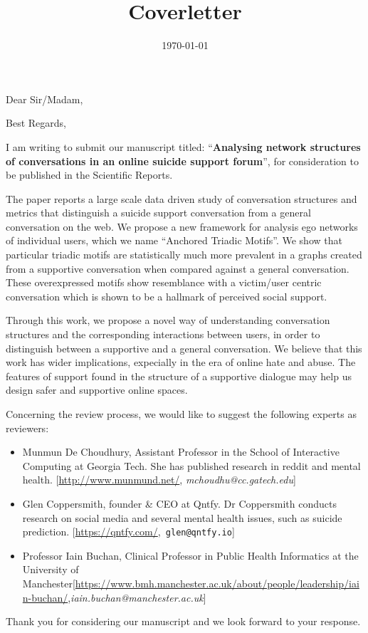 \documentclass[11pt,a4paper,roman]{moderncv}        %
\title{Coverletter}                               %
\begin{document}
    \date{\today}
    \opening{Dear Sir/Madam,}
    \closing{Best Regards,}
    \makelettertitle
    
    
   I am writing to submit our manuscript titled: ``\textbf{Analysing network structures of conversations in an online suicide support forum}'', for consideration to be published in the Scientific Reports.
   
   The paper reports a large scale data driven study of conversation structures and metrics that distinguish a suicide support conversation from a general conversation on the web. We propose a new framework for analysis ego networks of individual users, which we name ``Anchored Triadic Motifs''. We show that particular triadic motifs are statistically much more prevalent in a graphs created from a supportive conversation when compared against a general conversation. These overexpressed motifs show resemblance with a victim/user centric conversation which is shown to be a hallmark of perceived social support.
   
   Through this work, we propose a novel way of understanding conversation structures and the corresponding interactions between users, in order to distinguish between a supportive and a general conversation. 
   We believe that this work has wider implications, expecially in the era of online hate and abuse. The features of support found in the structure of a supportive dialogue may help us design safer and supportive online spaces.
  
  
   Concerning the review process, we would like to suggest the following experts as reviewers:
   \begin{itemize}
        \item Munmun De Choudhury, Assistant Professor in the School of Interactive Computing at Georgia Tech. She has published research in reddit and mental health. [\url{http://www.munmund.net/}, \textit{mchoudhu@cc.gatech.edu}]
        \item Glen Coppersmith, founder \& CEO at Qntfy. Dr Coppersmith conducts research on social media and several mental health issues, such as suicide prediction. [\url{https://qntfy.com/},\texttt{ glen@qntfy.io}]
        \item Professor Iain Buchan, Clinical Professor in Public Health Informatics at the University of Manchester[\url{https://www.bmh.manchester.ac.uk/about/people/leadership/iain-buchan/},\textit{iain.buchan@manchester.ac.uk}]
  
    \end{itemize}
  
   Thank you for considering our manuscript and we look forward to your response.
   
   \makeletterclosing
    
\end{document}

